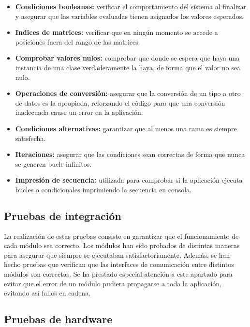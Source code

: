 		\begin{itemize}
			\item \textbf{Condiciones booleanas:} verificar el comportamiento del sistema al finalizar y asegurar que las variables evaluadas tienen asignados los valores esperados.

			\item \textbf{Indices de matrices:} verificar que en ningún momento se accede a posiciones fuera del rango de las matrices.

			\item \textbf{Comprobar valores nulos:} comprobar que donde se espera que haya una instancia de una clase verdaderamente la haya, de forma que el valor no sea nulo.

			\item \textbf{Operaciones de conversión:} asegurar que la conversión de un tipo a otro de datos es la apropiada, reforzando el código para que una conversión inadecuada cause un error en la aplicación.

			\item \textbf{Condiciones alternativas:} garantizar que al menos una rama es siempre satisfecha.

			\item \textbf{Iteraciones:} asegurar que las condiciones sean correctas de forma que nunca se generen bucle infinitos.

			\item \textbf{Impresión de secuencia:} utilizada para comprobar si la aplicación ejecuta bucles o condicionales imprimiendo la secuencia en consola.
		\end{itemize}

	\subsection{Pruebas de integración}

		La realización de estas pruebas consiste en garantizar que el funcionamiento de cada módulo sea correcto. Los módulos han sido probados de distintas maneras para asegurar que siempre se ejecutaban satisfactoriamente. Además, se han hecho pruebas que verifican que las interfaces de comunicación entre distintos módulos son correctas. Se ha prestado especial atención a este apartado para evitar que el error de un módulo pudiera propagarse a toda la aplicación, evitando así fallos en cadena.

	\subsection{Pruebas de hardware}

